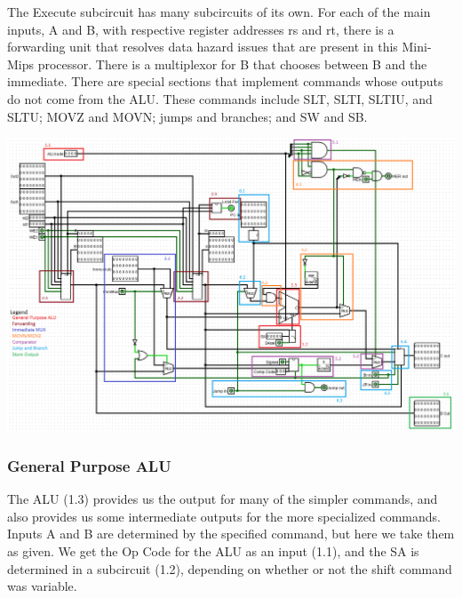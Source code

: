 \documentclass{article}
\begin{document}
The Execute subcircuit has many subcircuits of its own. For each of the main inputs, A and B, with respective register addresses rs and rt, there is a forwarding unit that resolves data hazard issues that are present in this Mini-Mips processor. There is a multiplexor for B that chooses between B and the immediate. There are special sections that implement commands whose outputs do not come from the ALU. These commands include SLT, SLTI, SLTIU, and SLTU; MOVZ and MOVN; jumps and branches; and SW and SB. 

\includegraphics[width=17cm]{EXOVER.png}

\subsubsection{General Purpose ALU}
The ALU (1.3) provides us the output for many of the simpler commands, and also provides us some intermediate outputs for the more specialized commands. Inputs A and B are determined by the specified command, but here we take them as given. We get the Op Code for the ALU as an input (1.1), and the SA is determined in a subcircuit (1.2), depending on whether or not the shift command was variable.  
\end{document}
